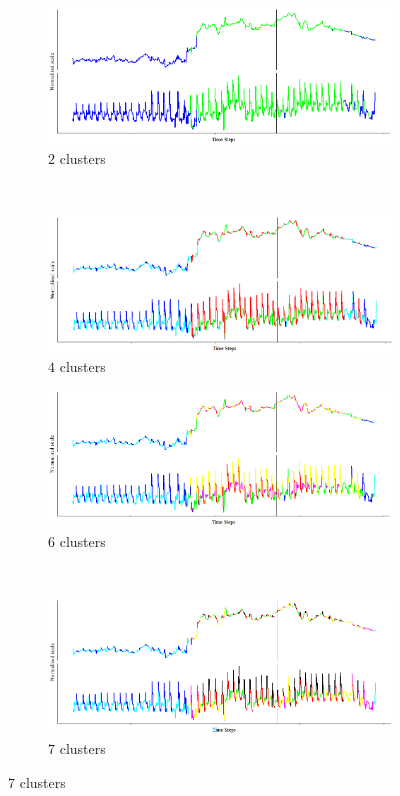 \documentclass[11pt]{article} %
\theoremstyle{plain}
\theoremstyle{definition}
\begin{document}
\begin{figure}[H]
	\centering
	
	\begin{subfigure}[b]{0.4\textwidth}
		\includegraphics[width=\textwidth]{ex2_context_timeline_2.PNG}
		\caption{\(2\) clusters}
		\label{fig:ex2_context_timeline_2}
	\end{subfigure}
	~
	\begin{subfigure}[b]{0.4\textwidth}
		\includegraphics[width=\textwidth]{ex2_context_timeline_4.PNG}
		\caption{\(4\) clusters}
		\label{fig:ex2_context_timeline_4}
	\end{subfigure}
	
	\begin{subfigure}[b]{0.4\textwidth}
		\includegraphics[width=\textwidth]{ex2_context_timeline_6.PNG}
		\caption{\(6\) clusters}
		\label{fig:ex2_context_timeline_6}
	\end{subfigure}
	~
	\begin{subfigure}[b]{0.4\textwidth}
		\includegraphics[width=\textwidth]{ex2_context_timeline_7.PNG}
		\caption{\(7\) clusters}
		\label{fig:ex2_context_timeline_7}
	\end{subfigure}
	

\end{figure}
\end{document}
